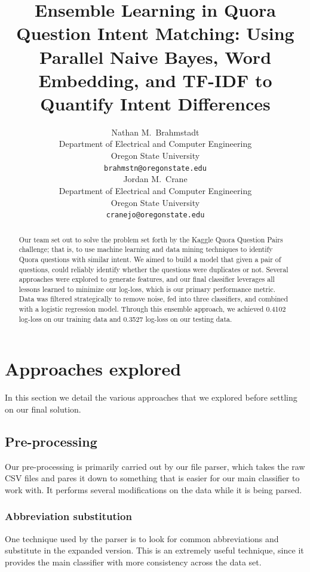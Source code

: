 \documentclass{article}
\title{Ensemble Learning in Quora Question Intent Matching:
Using Parallel Naive Bayes, Word Embedding, and TF-IDF to Quantify Intent Differences}
\author{
    Nathan M.~Brahmstadt \\
  Department of Electrical and Computer Engineering\\
  Oregon State University\\
  \texttt{brahmstn@oregonstate.edu} \\
  \And
  Jordan M.~Crane \\
  Department of Electrical and Computer Engineering \\
  Oregon State University \\
  \texttt{cranejo@oregonstate.edu} \\
}
\begin{document}

\maketitle

\begin{abstract}
    Our team set out to solve the problem set forth by the Kaggle Quora Question
    Pairs challenge; that is, to use machine learning and data mining techniques
    to identify Quora questions with similar intent. We aimed to build a model
    that given a pair of questions, could reliably identify whether the
    questions were duplicates or not. Several approaches were explored to
    generate features, and our final classifier leverages all lessons learned
    to minimize our log-loss, which is our primary performance metric. Data was
    filtered strategically to remove noise, fed into three classifiers,
    and combined with a logistic regression model. Through this ensemble
    approach, we achieved 0.4102 log-loss on our training data and 0.3527
    log-loss on our testing data.
\end{abstract}

\section{Approaches explored}

In this section we detail the various approaches that we explored before
settling on our final solution.

\subsection{Pre-processing}

Our pre-processing is primarily carried out by our file parser, which takes the
raw CSV files and pares it down to something that is easier for our main
classifier to work with. It performs several modifications on the data while it
is being parsed.

\subsubsection{Abbreviation substitution}

One technique used by the parser is to look for common abbreviations and
substitute in the expanded version. This is an extremely useful technique, since
it provides the main classifier with more consistency across the data set.
\end{document}
